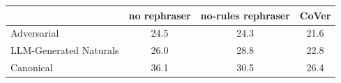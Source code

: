 \begin{tabular}{@{}lccc@{}}
\toprule
 & no rephraser & no-rules rephraser & CoVer \\
\midrule
Adversarial & 24.5 & 24.3 & 21.6 \\
LLM-Generated Naturals & 26.0 & 28.8 & 22.8 \\
Canonical & 36.1 & 30.5 & 26.4 \\
\bottomrule
\end{tabular}
